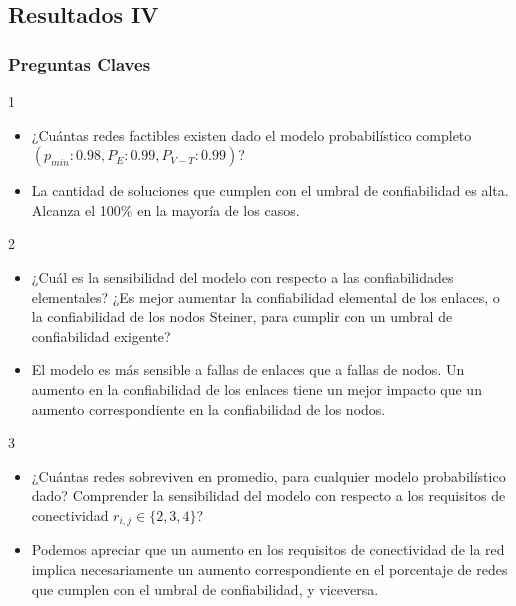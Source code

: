 \subsection{Resultados IV}
\begin{frame} \frametitle{Preguntas Claves}
\begin{tiny}
\begin{block} {1}
 	 \begin{itemize}
 	 	\item ¿Cuántas redes factibles existen dado el modelo probabilístico completo $(p_{min}:0.98,P_E:0.99,P_{V-T}:0.99)$?
 	 	\item La cantidad de soluciones que cumplen con el umbral de confiabilidad es alta. Alcanza el 100\% en la mayoría de los casos.
 	 \end{itemize}  
 \end{block} 	   
 \begin{block} {2}
 	 \begin{itemize}
 	 	\item ¿Cuál es la sensibilidad del modelo con respecto a las confiabilidades elementales? ¿Es mejor aumentar la confiabilidad elemental de los enlaces, o la confiabilidad de los nodos Steiner, para cumplir con un umbral de confiabilidad exigente?
 	 	\item El modelo es más sensible a fallas de enlaces que a fallas de nodos. Un aumento en la confiabilidad de los enlaces tiene un mejor impacto que un aumento correspondiente en la confiabilidad de los nodos.
 	 \end{itemize}  
 \end{block} 	
  \begin{block} {3}
 	 \begin{itemize}
 	 	\item ¿Cuántas redes sobreviven en promedio, para cualquier modelo probabilístico dado? Comprender la sensibilidad del modelo con respecto a los requisitos de conectividad $r_{i,j} \in \{2,3,4\}$?
 	 	\item Podemos apreciar que un aumento en los requisitos de conectividad de la red implica necesariamente un aumento correspondiente en el porcentaje de redes que cumplen con el umbral de confiabilidad, y viceversa.
 	 \end{itemize}  
 \end{block} 	
 \end{tiny}
\end{frame}

